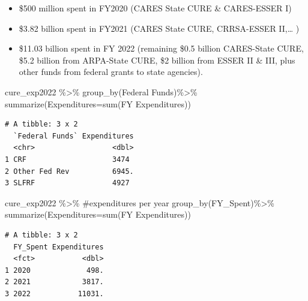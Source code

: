 \documentclass[
  letterpaper,
  DIV=11,
  numbers=noendperiod]{scrreport}
\newenvironment{Shaded}{\begin{snugshade}}{\end{snugshade}}
\newcommand{\AttributeTok}[1]{\textcolor[rgb]{0.40,0.45,0.13}{#1}}
\newcommand{\CommentTok}[1]{\textcolor[rgb]{0.37,0.37,0.37}{#1}}
\newcommand{\FunctionTok}[1]{\textcolor[rgb]{0.28,0.35,0.67}{#1}}
\newcommand{\NormalTok}[1]{\textcolor[rgb]{0.00,0.23,0.31}{#1}}
\newcommand{\SpecialCharTok}[1]{\textcolor[rgb]{0.37,0.37,0.37}{#1}}
\newcommand{\StringTok}[1]{\textcolor[rgb]{0.13,0.47,0.30}{#1}}
\providecommand{\tightlist}{%
  \setlength{\itemsep}{0pt}\setlength{\parskip}{0pt}}\usepackage{longtable,booktabs,array}
\begin{document}
\begin{itemize}
\tightlist
\item
  \$500 million spent in FY2020 (CARES State CURE \& CARES-ESSER I)
\item
  \$3.82 billion spent in FY2021 (CARES State CURE, CRRSA-ESSER
  II,\ldots{} )
\item
  \$11.03 billion spent in FY 2022 (remaining \$0.5 billion CARES-State
  CURE, \$5.2 billion from ARPA-State CURE, \$2 billion from ESSER II \&
  III, plus other funds from federal grants to state agencies).
\end{itemize}

\begin{Shaded}
\begin{Highlighting}[]
\NormalTok{cure\_exp2022 }\SpecialCharTok{\%\textgreater{}\%} 
  \FunctionTok{group\_by}\NormalTok{(}\StringTok{\textasciigrave{}}\AttributeTok{Federal Funds}\StringTok{\textasciigrave{}}\NormalTok{)}\SpecialCharTok{\%\textgreater{}\%} 
  \FunctionTok{summarize}\NormalTok{(}\AttributeTok{Expenditures=}\FunctionTok{sum}\NormalTok{(}\StringTok{\textasciigrave{}}\AttributeTok{FY Expenditures}\StringTok{\textasciigrave{}}\NormalTok{))}
\end{Highlighting}
\end{Shaded}

\begin{verbatim}
# A tibble: 3 x 2
  `Federal Funds` Expenditures
  <chr>                  <dbl>
1 CRF                    3474 
2 Other Fed Rev          6945.
3 SLFRF                  4927 
\end{verbatim}

\begin{Shaded}
\begin{Highlighting}[]
\NormalTok{cure\_exp2022 }\SpecialCharTok{\%\textgreater{}\%} \CommentTok{\#expenditures per year}
  \FunctionTok{group\_by}\NormalTok{(}\StringTok{\textasciigrave{}}\AttributeTok{FY\_Spent}\StringTok{\textasciigrave{}}\NormalTok{)}\SpecialCharTok{\%\textgreater{}\%} 
  \FunctionTok{summarize}\NormalTok{(}\AttributeTok{Expenditures=}\FunctionTok{sum}\NormalTok{(}\StringTok{\textasciigrave{}}\AttributeTok{FY Expenditures}\StringTok{\textasciigrave{}}\NormalTok{))}
\end{Highlighting}
\end{Shaded}

\begin{verbatim}
# A tibble: 3 x 2
  FY_Spent Expenditures
  <fct>           <dbl>
1 2020             498.
2 2021            3817.
3 2022           11031.
\end{verbatim}
\end{document}
